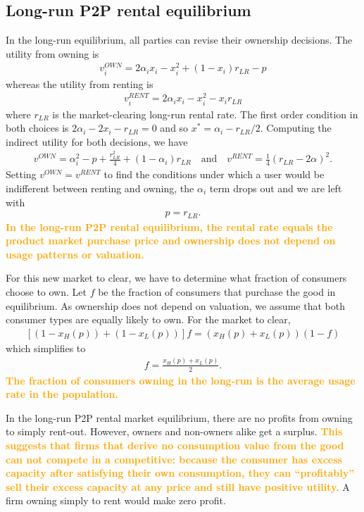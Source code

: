 \documentclass[11pt]{article}
\newcommand{\important}[1]{\textcolor{orange}{\textbf{#1}}}
\newcommand{\important}[1]{#1}
\begin{document}
\subsection{Long-run P2P rental equilibrium} 
In the long-run equilibrium, all parties can revise their ownership decisions. 
The utility from owning is 
\begin{align}
v^{OWN}_i = 2\alpha_i x_i - x_i^2 + (1-x_i)r_{LR} - p   
\end{align} 
whereas the utility from renting is 
\begin{align}
v^{RENT}_{i} = 2\alpha_i x_i - x_i^2 - x_i r_{LR}  
\end{align} 
where $r_{LR}$ is the market-clearing long-run rental rate. 
The first order condition in both choices is $2 \alpha_i - 2 x_i - r_{LR} = 0$ and so $x^* = \alpha_i - r_{LR}/2$. 
Computing the indirect utility for both decisions, we have
\begin{align} 
v^{OWN} = \alpha_i^2 - p + \frac{r_{LR}^2}{4} + (1 - \alpha_i) r_{LR} \quad  \mbox{and} \quad v^{RENT} = \frac{1}{4} (r_{LR}- 2\alpha )^2. 
\end{align} 
Setting $v^{OWN} = v^{RENT}$ to find the conditions under which a user would be indifferent between renting and owning, the $\alpha_i$ term drops out and we are left with 
\begin{align}
p = r_{LR}. 
\end{align}
 \important{In the long-run P2P rental equilibrium, the rental rate equals the product market purchase price and ownership does not depend on usage patterns or valuation.}  

For this new market to clear, we have to determine what fraction of consumers choose to own. 
Let $f$ be the fraction of consumers that purchase the good in equilibrium. 
As ownership does not depend on valuation, we assume that both consumer types are equally likely to own. 
For the market to clear, 
\begin{align}
\left[ (1-x_H(p)) + (1-x_L(p))\right]f = \left(x_H(p) + x_L(p) \right)(1- f) 
\end{align} 
which simplifies to 
\begin{align}
f = \frac{x_H(p) + x_L(p)}{2}.  
\end{align} 
\important{The fraction of consumers owning in the long-run is the average usage rate in the population.}  

In the long-run P2P rental market equilibrium, there are no profits from owning to simply rent-out. 
However, owners and non-owners alike get a surplus. 
\important{This suggests that firms that derive no consumption value from the good can not compete in a competitive: 
because the consumer has excess capacity after satisfying their own consumption, they can ``profitably'' sell their excess capacity at any price and still have positive utility.} 
A firm owning simply to rent would make zero profit. 
\end{document}
